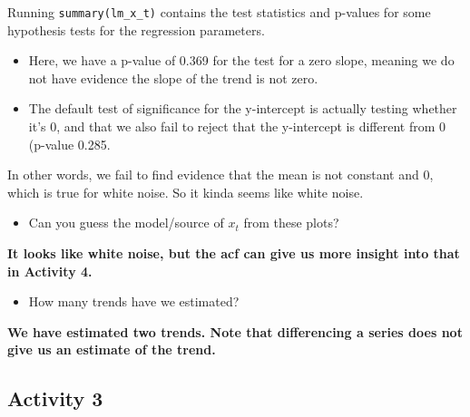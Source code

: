 \documentclass[
  letterpaper,
  DIV=11,
  numbers=noendperiod]{scrartcl}
\providecommand{\tightlist}{%
  \setlength{\itemsep}{0pt}\setlength{\parskip}{0pt}}\usepackage{longtable,booktabs,array}
\begin{document}
\begin{tcolorbox}[enhanced jigsaw, left=2mm, opacitybacktitle=0.6, coltitle=black, title=\textcolor{quarto-callout-note-color}{\faInfo}\hspace{0.5em}{Regression significance tests that suggest white noise.}, rightrule=.15mm, colbacktitle=quarto-callout-note-color!10!white, opacityback=0, toptitle=1mm, toprule=.15mm, breakable, bottomtitle=1mm, titlerule=0mm, colback=white, arc=.35mm, bottomrule=.15mm, leftrule=.75mm, colframe=quarto-callout-note-color-frame]

Running \texttt{summary(lm\_x\_t)} contains the test statistics and
p-values for some hypothesis tests for the regression parameters.

\begin{itemize}
\tightlist
\item
  Here, we have a p-value of 0.369 for the test for a zero slope,
  meaning we do not have evidence the slope of the trend is not zero.
\item
  The default test of significance for the y-intercept is actually
  testing whether it's 0, and that we also fail to reject that the
  y-intercept is different from 0 (p-value 0.285.
\end{itemize}

In other words, we fail to find evidence that the mean is not constant
and 0, which is true for white noise. So it kinda seems like white
noise.

\end{tcolorbox}

\begin{itemize}
\tightlist
\item
  Can you guess the model/source of \(x_t\) from these plots?
\end{itemize}

\textbf{It looks like white noise, but the acf can give us more insight
into that in Activity 4.}

\begin{itemize}
\tightlist
\item
  How many trends have we estimated?
\end{itemize}

\textbf{We have estimated two trends. Note that differencing a series
does not give us an estimate of the trend.}

\subsection{Activity 3}\label{activity-3}
\end{document}
